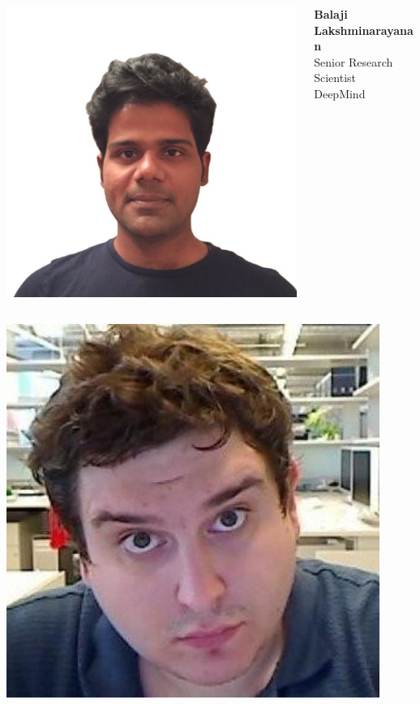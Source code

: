 \documentclass[compress]{beamer}
\begin{document}
\begin{frame}
\begin{columns}
\begin{column}{.3\textwidth}
        \includegraphics[width=\textwidth]{auth2} 
    \end{column}
    \begin{column}{.2\textwidth}
        \tiny
        \textbf{Balaji Lakshminarayanan} \\
        Senior Research Scientist \\
        DeepMind \\
    \end{column}
\end{columns}
\vfill
\begin{columns}
    \begin{column}{.3\textwidth}
        \includegraphics[width=\textwidth]{auth3} 

\end{column}
\end{columns}
\end{frame}
\end{document}
